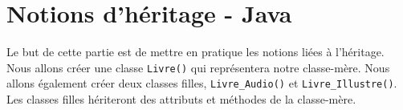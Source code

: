 \begin{solution}
	
\end{solution}
\begin{solution}
	
\end{solution}

\newpage

\section{Notions d'héritage - Java}

Le but de cette partie est de mettre en pratique les notions liées à l'héritage. 
Nous allons créer une classe \lstinline{Livre()} qui représentera notre classe-mère. Nous allons également créer deux classes filles, \lstinline{Livre_Audio()} et \lstinline{Livre_Illustre()}. Les classes filles hériteront des attributs et méthodes de la classe-mère. \\

